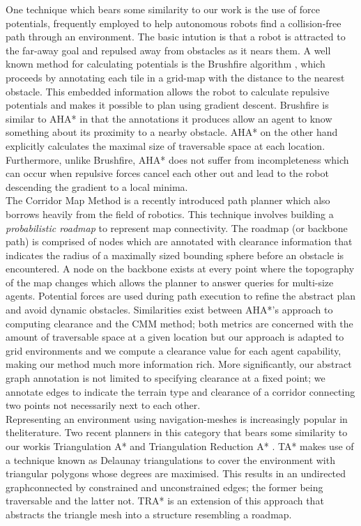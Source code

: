 \documentclass[a4paper]{article}
\begin{document}
One technique which bears some similarity to our work is the use of force potentials, frequently employed to help autonomous robots find a collision-free path through an environment. The basic intution is that a robot is attracted to the far-away goal and repulsed away from obstacles as it nears them. A well known method for calculating potentials is the Brushfire algorithm \cite{latombe91}, which proceeds by annotating each tile in a grid-map with the distance to the nearest obstacle. This embedded information allows the robot to calculate repulsive potentials and makes it possible to plan using gradient descent. \newline
Brushfire is similar to AHA* in that the annotations it produces allow an agent to know something about its proximity to a nearby obstacle. AHA* on the other hand explicitly calculates the maximal size of traversable space at each location. Furthermore, unlike Brushfire, AHA* does not suffer from incompleteness which can occur when repulsive forces cancel each other out and lead to the robot descending the gradient to a local minima.\\ \newline
The Corridor Map Method \cite{geraerts07} is a recently introduced path planner which also borrows heavily from the field of robotics. This technique involves building a \emph{probabilistic roadmap} to represent map connectivity. The roadmap (or backbone path) is comprised of nodes which are annotated with clearance information that indicates the radius of a maximally sized bounding sphere before an obstacle is encountered. A node on the backbone exists at every point where the topography of the map changes which allows the planner to answer queries for multi-size agents. Potential forces are used during path execution to refine the abstract plan and avoid dynamic obstacles. \newline
Similarities exist between AHA*'s approach to computing clearance and the CMM  method; both metrics are concerned with the amount of traversable space at a given location but our approach is adapted to grid environments and we compute a clearance value for each agent capability, making our method much more information rich. More significantly, our abstract graph annotation is not limited to specifying clearance at a fixed point; we annotate edges to indicate the terrain type and clearance of a corridor connecting two points not necessarily next to each other. \\ \newline
Representing an environment using navigation-meshes is increasingly popular in theliterature. Two recent planners in this category that bears some similarity to our workis Triangulation A* and Triangulation Reduction A* \cite{demyen07}. TA* makes use of a technique known as Delaunay triangulations to cover the environment with triangular polygons whose degrees are maximised. This results in an undirected graphconnected by constrained and unconstrained edges; the former being traversable and the latter not. TRA* is an extension of this approach that abstracts the triangle mesh into a structure resembling a roadmap. 
\end{document}
